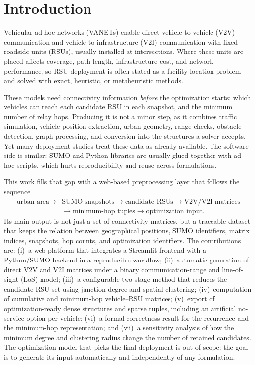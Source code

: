 \documentclass[engproc,proceedingpaper,submit,oneauthor]{Definitions/mdpi}
\newcommand{\added}[1]{#1}
\begin{document}
\section{Introduction}

Vehicular ad hoc networks (VANETs) enable direct vehicle-to-vehicle (V2V)
communication and vehicle-to-infrastructure (V2I) communication with fixed roadside
units (RSUs), usually installed at intersections. Where these units are placed affects
coverage, path length, infrastructure cost, and network performance, so RSU deployment
is often stated as a facility-location problem and solved with exact, heuristic, or
metaheuristic methods.

These models need connectivity information \emph{before} the optimization starts:
which vehicles can reach each candidate RSU in each snapshot, and the minimum number of
relay hops. Producing it is not a minor step, as it combines traffic simulation,
vehicle-position extraction, urban geometry, range checks, obstacle detection, graph
processing, and conversion into the structures a solver accepts. Yet many deployment
studies treat these data as already available. The software side is similar: SUMO and
Python libraries are usually glued together with ad-hoc scripts, which hurts
reproducibility and reuse across formulations.

This work fills that gap with a web-based preprocessing layer that follows the
sequence
\[
\begin{aligned}
\text{urban area}\rightarrow{}&\text{SUMO snapshots}\rightarrow\text{candidate RSUs}
\rightarrow\text{V2V/V2I matrices}\\
&\rightarrow\text{minimum-hop tuples}\rightarrow\text{optimization input}.
\end{aligned}
\]
\added{Its main output is not just a set of connectivity matrices, but a traceable
dataset that keeps the relation between geographical positions, SUMO identifiers,
matrix indices, snapshots, hop counts, and optimization identifiers.} The
contributions are: (i)~a web platform that integrates a Streamlit frontend with a
Python/SUMO backend in a reproducible workflow; (ii)~automatic generation of direct
V2V and V2I matrices under a binary communication-range and line-of-sight (LoS) model;
(iii)~a configurable two-stage method that reduces the candidate RSU set using
junction degree and spatial clustering; (iv)~computation of cumulative and minimum-hop
vehicle--RSU matrices; (v)~export of optimization-ready dense structures and sparse
tuples, including an artificial no-service option per vehicle; \added{(vi)~a formal
correctness result for the recurrence and the minimum-hop representation; and (vii)~a
sensitivity analysis of how the minimum degree and clustering radius change the number
of retained candidates.} The optimization model that picks the final deployment is out
of scope: the goal is to generate its input automatically and independently of any
formulation.
\end{document}
